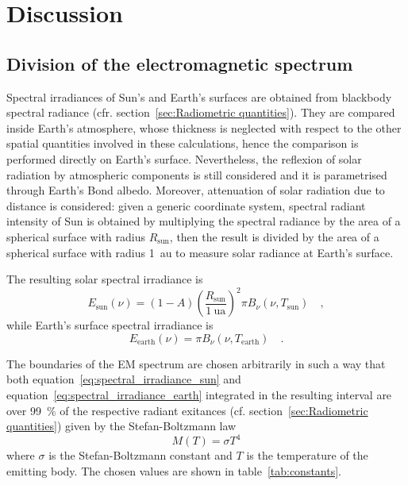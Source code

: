 \documentclass[a4paper,10pt,twocolumn,\classoptions]{article}
\begin{document}
\section{Discussion}



\subsection{Division of the electromagnetic spectrum}
\label{sec:Division of the electromagnetic spectrum}
Spectral irradiances of Sun's and Earth's surfaces are obtained from blackbody spectral radiance (cfr. section~\ref{sec:Radiometric quantities}). They are compared inside Earth's atmosphere, whose thickness is neglected with respect to the other spatial quantities involved in these calculations, hence the comparison is performed directly on Earth's surface. Nevertheless, the reflexion of solar radiation by atmospheric components is still considered and it is parametrised through Earth's Bond albedo. Moreover, attenuation of solar radiation due to distance is considered: given a generic coordinate system, spectral radiant intensity of Sun is obtained by multiplying the spectral radiance by the area of a spherical surface with radius $R_\text{sun}$, then the result is divided by the area of a spherical surface with radius \qty{1}{\astronomicalunit} to measure solar radiance at Earth's surface.

The resulting solar spectral irradiance is
\begin{equation}
  \label{eq:spectral_irradiance_sun}
  E_\text{sun}(\nu) = (1 - A) \left( \frac{R_\text{sun}}{\qty{1}{\astronomicalunit}} \right)^2 \pi B_\nu(\nu, T_\text{sun})
  \quad ,
\end{equation}
while Earth's surface spectral irradiance is
\begin{equation}
  \label{eq:spectral_irradiance_earth}
  E_\text{earth}(\nu) = \pi B_\nu(\nu, T_\text{earth})
  \quad .
\end{equation}

The boundaries of the EM spectrum are chosen arbitrarily in such a way that both equation~\eqref{eq:spectral_irradiance_sun} and equation~\eqref{eq:spectral_irradiance_earth} integrated in the resulting interval are over \qty{99}{\percent} of the respective radiant exitances (cf. section~\ref{sec:Radiometric quantities}) given by the Stefan-Boltzmann law
\begin{equation}
  \label{eq:stefan-boltzmann_law}
  M(T) = \sigma T^4
\end{equation}
where $\sigma$ is the Stefan-Boltzmann constant and $T$ is the temperature of the emitting body. The chosen values are shown in table~\ref{tab:constants}.
\end{document}
